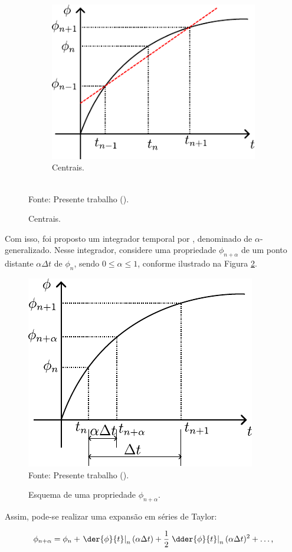 \begin{figure}[h!]
\begin{subfigure}{0.32\textwidth}
        \includegraphics[width=\linewidth]{Figuras/DifCen.pdf}
        \caption{Centrais.}
    \end{subfigure}
    \\Fonte: Presente trabalho (\the\year).
    \label{fig:DifFin}
\end{figure}

Com isso, foi proposto um integrador temporal por \cite{chung1993time}, denominado de $\alpha$-generalizado. Nesse integrador, considere uma propriedade $\phi_{n+\alpha}$ de um ponto distante $\alpha\Delta t$ de $\phi_n$, sendo $0\leq\alpha\leq1$, conforme ilustrado na Figura \ref{fig:alpha-gen}.

\begin{figure}[h!]
    \centering
    \caption{Esquema de uma propriedade $\phi_{n+\alpha}$.}
    \includegraphics[width=.4\linewidth]{Figuras/alpha-gen.pdf}
    \\Fonte: Presente trabalho (\the\year).
    \label{fig:alpha-gen}
\end{figure}

Assim, pode-se realizar uma expansão em séries de Taylor:

\begin{equation}
    \phi_{n+\alpha}=\phi_n+\left.\der{\phi}{t}\right|_{n}(\alpha\Delta t)+\frac{1}{2}\left.\dder{\phi}{t}\right|_{n}(\alpha\Delta t)^2+\hdots\text{,}
    \label{eq:Taylor-alpha-gen}
\end{equation}

